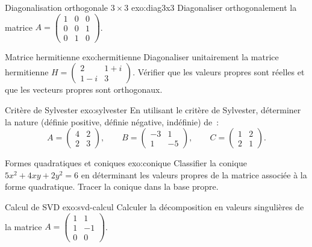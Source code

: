 \begin{exercise}{Diagonalisation orthogonale $3 \times 3$ \basic}{exo:diag3x3}
  Diagonaliser orthogonalement la matrice
  $A = \begin{pmatrix} 1 & 0 & 0 \\ 0 & 0 & 1 \\ 0 & 1 & 0 \end{pmatrix}$.
\end{exercise}

\begin{exercise}{Matrice hermitienne \intermediate}{exo:hermitienne}
  Diagonaliser unitairement la matrice hermitienne
  $H = \begin{pmatrix} 2 & 1+i \\ 1-i & 3 \end{pmatrix}$.
  Vérifier que les valeurs propres sont réelles et que les vecteurs propres
  sont orthogonaux.
\end{exercise}

\begin{exercise}{Critère de Sylvester \basic}{exo:sylvester}
  En utilisant le critère de Sylvester, déterminer la nature
  (définie positive, définie négative, indéfinie) de~:
  \[
    A = \begin{pmatrix} 4 & 2 \\ 2 & 3 \end{pmatrix}, \qquad
    B = \begin{pmatrix} -3 & 1 \\ 1 & -5 \end{pmatrix}, \qquad
    C = \begin{pmatrix} 1 & 2 \\ 2 & 1 \end{pmatrix}.
  \]
\end{exercise}

\begin{exercise}{Formes quadratiques et coniques \intermediate}{exo:conique}
  Classifier la conique $5x^2 + 4xy + 2y^2 = 6$ en déterminant les
  valeurs propres de la matrice associée à la forme quadratique.
  Tracer la conique dans la base propre.
\end{exercise}

\begin{exercise}{Calcul de SVD \intermediate}{exo:svd-calcul}
  Calculer la décomposition en valeurs singulières de la matrice
  $A = \begin{pmatrix} 1 & 1 \\ 1 & -1 \\ 0 & 0 \end{pmatrix}$.
\end{exercise}

